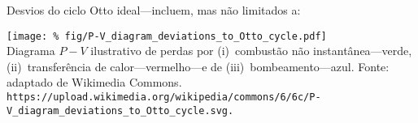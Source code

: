     \begin{frame}{Desvios do ciclo Otto ideal---incluem, mas não limitados a:}\vspace*{-2em}
        \begin{center}
            \texttt{[image: \%
                fig/P-V\_diagram\_deviations\_to\_Otto\_cycle.pdf]}\\
            \footnotesize  Diagrama  $P-V$  ilustrativo  de   perdas   por   (i)~combustão   não
                instantânea---verde,    (ii)~transferência    de     calor---vermelho---e     de
                (iii)~bombeamento---azul. Fonte: adaptado de Wikimedia Commons.
            {\tiny\tt https://upload.wikimedia.org/wikipedia/commons/6/6c/P-V\_diagram\_deviations\_to\_Otto\_cycle.svg.}
        \end{center}
    \end{frame}

